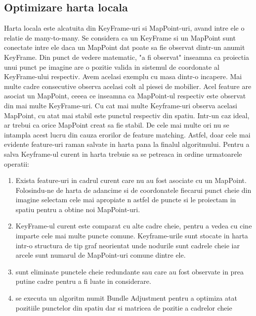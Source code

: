 \documentclass[12pt,a4paper]{report}
\begin{document}
\subsection{Optimizare harta locala}
Harta locala este alcatuita din KeyFrame-uri si MapPoint-uri, avand intre ele o relatie de many-to-many.
Se considera ca un KeyFrame si un MapPoint sunt conectate intre ele daca un MapPoint dat poate sa 
fie observat dintr-un anumit KeyFrame. Din punct de vedere matematic, "a fi observat"  inseamna ca proiectia
unui punct pe imagine are o pozitie valida in sistemul de coordonate al KeyFrame-ului respectiv. 
Avem acelasi exemplu cu masa dintr-o incapere. 
Mai multe cadre consecutive observa acelasi colt al piesei de mobilier. Acel feature are
asociat un MapPoint, ceeea ce inseamna ca MapPoint-ul respectiv este observat din mai multe 
KeyFrame-uri. Cu cat mai multe Keyframe-uri observa acelasi MapPoint, cu atat mai stabil este 
punctul respectiv din spatiu. Intr-un caz ideal, ar trebui ca orice MapPoint creat sa fie 
stabil. De cele mai multe ori nu se intampla acest lucru din cauza erorilor de feature matching.
Astfel, doar cele mai evidente feature-uri raman salvate in harta pana la finalul algoritmului.
Pentru a salva Keyframe-ul curent in harta trebuie sa se petreaca in ordine urmatoarele operatii:
\begin{enumerate}
    \item Exista feature-uri in cadrul curent care nu au fost asociate cu un MapPoint.
    Folosindu-ne de harta de adancime si de coordonatele fiecarui punct cheie din imagine selectam 
    cele mai apropiate n astfel de puncte si le proiectam in spatiu pentru a obtine noi MapPoint-uri.      
    \item KeyFrame-ul curent este comparat cu alte cadre cheie, pentru a vedea cu cine imparte 
    cele mai multe puncte comune. Keyframe-urile sunt stocate in harta intr-o structura de tip 
    graf neorientat unde nodurile sunt cadrele cheie iar arcele sunt numarul de MapPoint-uri comune 
    dintre ele.
    \item sunt eliminate punctele cheie redundante sau care au fost observate in prea putine 
    cadre pentru a fi luate in considerare.
    \item se executa un algoritm numit Bundle Adjustment pentru a optimiza atat 
    pozitiile punctelor din spatiu dar si matricea de pozitie a cadrelor cheie
\end{enumerate} 
 
\end{document}
